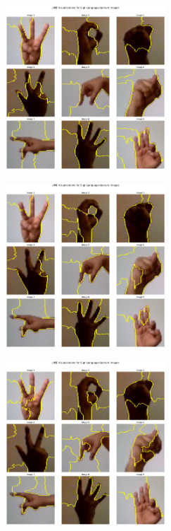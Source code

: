 \begin{multicols}{2}
\includegraphics[width=0.45\textwidth]{Assets/lime_visualization/MobileNetV3Large.png}

\vspace{0.8cm}

\includegraphics[width=0.45\textwidth]{Assets/lime_visualization/ResNet50.png}

\vspace{0.8cm}

\includegraphics[width=0.45\textwidth]{Assets/lime_visualization/RESNET101.png}

\vspace{0.8cm}

\newpage


\end{multicols}
